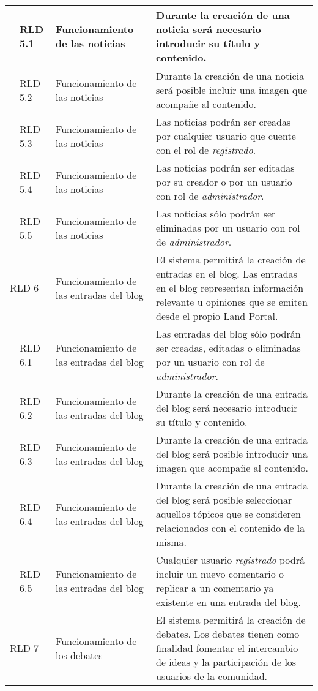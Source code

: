 \begin{longtable}[c]{|p{1mm}|p{14mm}|p{30mm}|p{90mm}|}
\hline
& RLD 5.1 & Funcionamiento de las noticias & Durante la creación de una noticia será necesario introducir su título y contenido. \\
\hline
& RLD 5.2 & Funcionamiento de las noticias & Durante la creación de una noticia será posible incluir una imagen que acompañe al contenido. \\
\hline
& RLD 5.3 & Funcionamiento de las noticias & Las noticias podrán ser creadas por cualquier usuario que cuente con el rol de \textit{registrado}. \\
\hline
& RLD 5.4 & Funcionamiento de las noticias & Las noticias podrán ser editadas por su creador o por un usuario con rol de \textit{administrador}. \\
\hline
& RLD 5.5 & Funcionamiento de las noticias & Las noticias sólo podrán ser eliminadas por un usuario con rol de \textit{administrador}. \\
\hline
\multicolumn{2}{|l|}{RLD 6} & Funcionamiento de las entradas del blog & El sistema permitirá la creación de entradas en el blog.  Las entradas en el blog representan información relevante u opiniones que se emiten desde el propio Land Portal. \\
\hline
& RLD 6.1 & Funcionamiento de las entradas del blog & Las entradas del blog sólo podrán ser creadas, editadas o eliminadas por un usuario con rol de \textit{administrador}. \\
\hline
& RLD 6.2 & Funcionamiento de las entradas del blog & Durante la creación de una entrada del blog será necesario introducir su título y contenido. \\
\hline
& RLD 6.3 & Funcionamiento de las entradas del blog & Durante la creación de una entrada del blog será posible introducir una imagen que acompañe al contenido. \\
\hline
& RLD 6.4 & Funcionamiento de las entradas del blog & Durante la creación de una entrada del blog será posible seleccionar aquellos tópicos que se consideren relacionados con el contenido de la misma. \\
\hline
& RLD 6.5 & Funcionamiento de las entradas del blog & Cualquier usuario \textit{registrado} podrá incluir un nuevo comentario o replicar a un comentario ya existente en una entrada del blog. \\
\hline
\multicolumn{2}{|l|}{RLD 7} & Funcionamiento de los debates & El sistema permitirá la creación de debates.  Los debates tienen como finalidad fomentar el intercambio de ideas y la participación de los usuarios de la comunidad. \\

\end{longtable}
